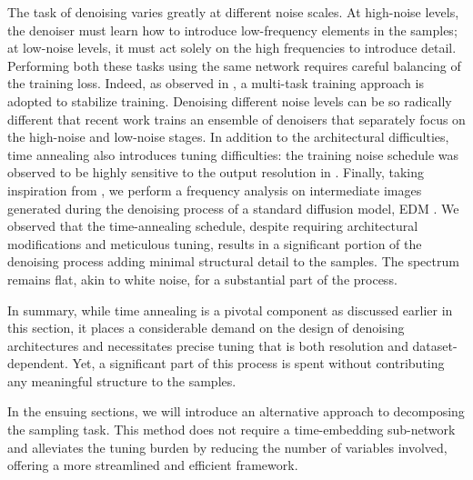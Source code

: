 The task of denoising varies greatly at different noise scales. At high-noise levels, the denoiser must learn how to introduce low-frequency elements in the samples; at low-noise levels, it must act solely on the high frequencies to introduce detail. Performing both these tasks using the same network requires careful balancing of the training loss. Indeed, as observed in \cite{karras_analyzing_2024}, a multi-task training approach is adopted to stabilize training. Denoising different noise levels can be so radically different that recent work \cite{balaji_ediff-i_2022} trains an ensemble of denoisers that separately focus on the high-noise and low-noise stages. In addition to the architectural difficulties, time annealing also introduces tuning difficulties: the training noise schedule was observed to be highly sensitive to the output resolution in \cite{chen_importance_2023}. Finally, taking inspiration from \cite{rissanen_generative_2022, dieleman_diffusion_2024}, we perform a frequency analysis on intermediate images generated during the denoising process of a standard diffusion model, EDM \cite{karras_elucidating_2022}.
 We observed that the time-annealing schedule, despite requiring architectural modifications and meticulous tuning, results in a significant portion of the denoising process adding minimal structural detail to the samples. %
 The spectrum remains flat, akin to white noise, for a substantial part of the process.

In summary, while time annealing is a pivotal component as discussed earlier in this section, it places a considerable demand on the design of denoising architectures and necessitates precise tuning that is both resolution and dataset-dependent. Yet, a significant part of this process is spent without contributing any meaningful structure to the samples. 

In the ensuing sections, we will introduce an alternative approach to decomposing the sampling task. This method does not require a time-embedding sub-network and alleviates the tuning burden by reducing the number of variables involved, offering a more streamlined and efficient framework.

